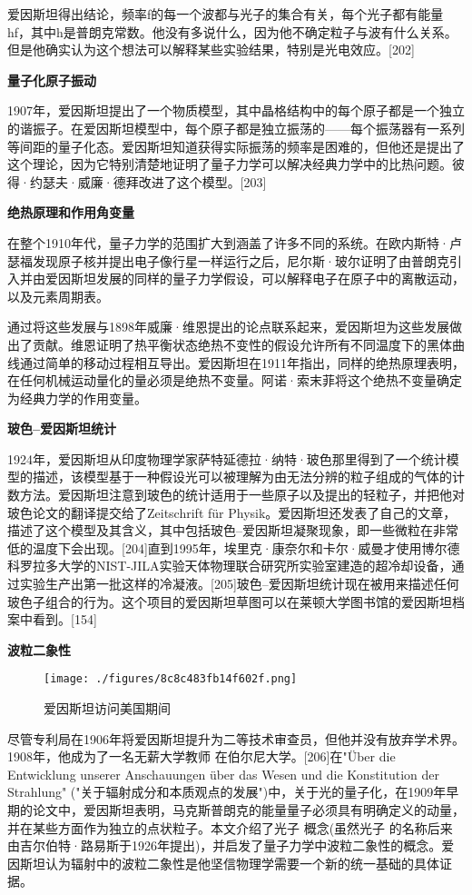 爱因斯坦得出结论，频率f的每一个波都与光子的集合有关，每个光子都有能量hf，其中h是普朗克常数。他没有多说什么，因为他不确定粒子与波有什么关系。但是他确实认为这个想法可以解释某些实验结果，特别是光电效应。[202]

\textbf{量子化原子振动}

1907年，爱因斯坦提出了一个物质模型，其中晶格结构中的每个原子都是一个独立的谐振子。在爱因斯坦模型中，每个原子都是独立振荡的——每个振荡器有一系列等间距的量子化态。爱因斯坦知道获得实际振荡的频率是困难的，但他还是提出了这个理论，因为它特别清楚地证明了量子力学可以解决经典力学中的比热问题。彼得·约瑟夫·威廉·德拜改进了这个模型。[203]

\textbf{绝热原理和作用角变量}

在整个1910年代，量子力学的范围扩大到涵盖了许多不同的系统。在欧内斯特·卢瑟福发现原子核并提出电子像行星一样运行之后，尼尔斯·玻尔证明了由普朗克引入并由爱因斯坦发展的同样的量子力学假设，可以解释电子在原子中的离散运动，以及元素周期表。

通过将这些发展与1898年威廉·维恩提出的论点联系起来，爱因斯坦为这些发展做出了贡献。维恩证明了热平衡状态绝热不变性的假设允许所有不同温度下的黑体曲线通过简单的移动过程相互导出。爱因斯坦在1911年指出，同样的绝热原理表明，在任何机械运动量化的量必须是绝热不变量。阿诺·索末菲将这个绝热不变量确定为经典力学的作用变量。

\textbf{玻色–爱因斯坦统计}

1924年，爱因斯坦从印度物理学家萨特延德拉·纳特·玻色那里得到了一个统计模型的描述，该模型基于一种假设光可以被理解为由无法分辨的粒子组成的气体的计数方法。爱因斯坦注意到玻色的统计适用于一些原子以及提出的轻粒子，并把他对玻色论文的翻译提交给了Zeitschrift für Physik。爱因斯坦还发表了自己的文章，描述了这个模型及其含义，其中包括玻色–爱因斯坦凝聚现象，即一些微粒在非常低的温度下会出现。[204]直到1995年，埃里克·康奈尔和卡尔·威曼才使用博尔德科罗拉多大学的NIST-JILA实验天体物理联合研究所实验室建造的超冷却设备，通过实验生产出第一批这样的冷凝液。[205]玻色–爱因斯坦统计现在被用来描述任何玻色子组合的行为。这个项目的爱因斯坦草图可以在莱顿大学图书馆的爱因斯坦档案中看到。[154]

\textbf{波粒二象性}

\begin{figure}[ht]
\centering
\texttt{[image: ./figures/8c8c483fb14f602f.png]}
\caption{爱因斯坦访问美国期间} \label{fig_AYST_20}
\end{figure}
尽管专利局在1906年将爱因斯坦提升为二等技术审查员，但他并没有放弃学术界。1908年，他成为了一名无薪大学教师 在伯尔尼大学。[206]在"Über die Entwicklung unserer Anschauungen über das Wesen und die Konstitution der Strahlung" ("关于辐射成分和本质观点的发展")中，关于光的量子化，在1909年早期的论文中，爱因斯坦表明，马克斯普朗克的能量量子必须具有明确定义的动量，并在某些方面作为独立的点状粒子。本文介绍了光子 概念(虽然光子 的名称后来由吉尔伯特·路易斯于1926年提出)，并启发了量子力学中波粒二象性的概念。爱因斯坦认为辐射中的波粒二象性是他坚信物理学需要一个新的统一基础的具体证据。

